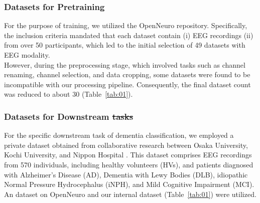 \documentclass[final,3p,times,twocolumn]{elsarticle}
\providecommand{\DIFaddtex}[1]{{\protect\color{blue}\uwave{#1}}} %
\providecommand{\DIFdeltex}[1]{{\protect\color{red}\sout{#1}}}                      %
\providecommand{\DIFaddbegin}{} %
\providecommand{\DIFaddend}{} %
\providecommand{\DIFdelbegin}{} %
\providecommand{\DIFdelend}{} %
\providecommand{\DIFadd}[1]{\texorpdfstring{\DIFaddtex{#1}}{#1}} %
\providecommand{\DIFdel}[1]{\texorpdfstring{\DIFdeltex{#1}}{}} %
\newcommand{\DIFscaledelfig}{0.5}
\newlength{\DIFdelgraphicswidth} %
\newlength{\DIFdelgraphicsheight} %
\newcommand{\DIFaddincludegraphics}[2][]{{\color{blue}\fbox{\DIFOincludegraphics[#1]{#2}}}} %
\newcommand{\DIFdelincludegraphics}[2][]{%
\sbox{\DIFdelgraphicsbox}{\DIFOincludegraphics[#1]{#2}}%
\settoboxwidth{\DIFdelgraphicswidth}{\DIFdelgraphicsbox} %
\settoboxtotalheight{\DIFdelgraphicsheight}{\DIFdelgraphicsbox} %
\scalebox{\DIFscaledelfig}{%
\parbox[b]{\DIFdelgraphicswidth}{\usebox{\DIFdelgraphicsbox}\\[-\baselineskip] \rule{\DIFdelgraphicswidth}{0em}}\llap{\resizebox{\DIFdelgraphicswidth}{\DIFdelgraphicsheight}{%
\setlength{\unitlength}{\DIFdelgraphicswidth}%
\begin{picture}(1,1)%
\thicklines\linethickness{2pt} %
{\color[rgb]{1,0,0}\put(0,0){\framebox(1,1){}}}%
{\color[rgb]{1,0,0}\put(0,0){\line( 1,1){1}}}%
{\color[rgb]{1,0,0}\put(0,1){\line(1,-1){1}}}%
\end{picture}%
}\hspace*{3pt}}} %
} %
\DeclareRobustCommand{\DIFaddbegin}{\DIFOaddbegin \let\includegraphics\DIFaddincludegraphics} %
\DeclareRobustCommand{\DIFaddend}{\DIFOaddend \let\includegraphics\DIFOincludegraphics} %
\DeclareRobustCommand{\DIFdelbegin}{\DIFOdelbegin \let\includegraphics\DIFdelincludegraphics} %
\DeclareRobustCommand{\DIFdelend}{\DIFOaddend \let\includegraphics\DIFOincludegraphics} %
\begin{document}
\subsubsection{Datasets for Pretraining}
For the purpose of training, we utilized the OpenNeuro repository. Specifically, the inclusion criteria mandated that each dataset contain (i) EEG recordings (ii) from over 50 participants, which led to the initial selection of 49 datasets with EEG modality. \cite{ds004902:1.0.0} \cite{ds004883:1.0.0} \cite{ds004771:1.0.0} \cite{ds004718:1.0.4} \cite{ds004626:1.0.2} \cite{ds004602:1.0.1} \cite{ds004595:1.0.0} \cite{ds004584:1.0.0} \cite{ds004580:1.0.0} \cite{ds004579:1.0.0} \cite{ds004577:1.0.1} \cite{ds004574:1.0.0} \cite{ds004572:1.2.0} \cite{ds004532:1.2.0} \cite{ds004515:1.0.0} \cite{ds004504:1.0.6} \cite{ds004448:1.0.2} \cite{ds004395:2.0.0} \cite{ds004362:1.0.0} \cite{ds004317:1.0.3} \cite{ds004315:1.0.0} \cite{ds004279:1.1.1} \cite{ds004256:1.0.5} \cite{ds004186:2.0.0} \cite{ds004166:1.0.0} \cite{ds004151:1.0.0} \cite{ds004148:1.0.1} \cite{ds004120:1.0.0} \cite{ds004118:1.0.1} \cite{ds004067:1.0.1} \cite{ds004019:1.0.0} \cite{ds003969:1.0.0} \cite{ds003947:1.0.1} \cite{ds003944:1.0.1} \cite{ds003838:1.0.5} \cite{ds003825:1.2.0} \cite{ds003775:1.2.1} \cite{ds003690:1.0.0} \cite{ds003655:1.0.2} \cite{ds003638:1.0.0} \cite{ds003602:1.0.1} \cite{ds003523:1.1.0} \cite{ds003522:1.1.0} \cite{ds003518:1.1.0} \cite{ds003509:1.1.0} \cite{ds003506:1.1.0} \cite{ds003490:1.1.0} \cite{ds003478:1.1.0} \cite{ds003474:1.1.0}
\\
\indent
However, during the preprocessing stage, which involved tasks such as channel renaming, channel selection, and data cropping, some datasets were found to be incompatible with our processing pipeline. Consequently, the final dataset count was reduced to about 30 (Table~\ref{tab:01}).
\\
\indent
\subsubsection{Datasets for Downstream \DIFdelbegin \DIFdel{tasks}\DIFdelend \DIFaddbegin \DIFadd{Tasks}\DIFaddend }
For the specific downstream task of dementia classification, we employed a private dataset obtained from collaborative research between Osaka University, Kochi University, and Nippon Hospital \cite{hata_precise_2023} \cite{watanabe_deep_2024}. This dataset comprises EEG recordings from 570 individuals, including healthy volunteers (HVs), and patients diagnosed with Alzheimer's Disease (AD), Dementia with Lewy Bodies (DLB), idiopathic Normal Pressure Hydrocephalus (iNPH), and Mild Cognitive Impairment (MCI).
An dataset on OpenNeuro \cite{ds003555:1.0.0} and our internal dataset (Table~\ref{tab:01}) were utilized.
\end{document}
